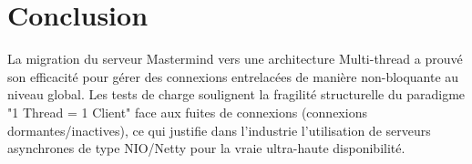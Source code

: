 \documentclass[11pt,a4paper]{article}
\begin{document}
\section{Conclusion}
La migration du serveur Mastermind vers une architecture Multi-thread a prouvé son efficacité pour gérer des connexions entrelacées de manière non-bloquante au niveau global. Les tests de charge soulignent la fragilité structurelle du paradigme "1 Thread = 1 Client" face aux fuites de connexions (connexions dormantes/inactives), ce qui justifie dans l'industrie l'utilisation de serveurs asynchrones de type NIO/Netty pour la vraie ultra-haute disponibilité.
\end{document}
